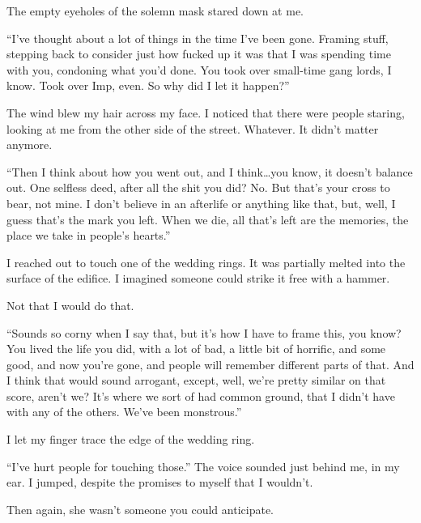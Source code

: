 The empty eyeholes of the solemn mask stared down at me.



``I've thought about a lot of things in the time I've been gone.  Framing stuff, stepping back to consider just how fucked up it was that I was spending time with you, condoning what you'd done.  You took over small-time gang lords, I know.  Took over Imp, even.  So why did I let it happen?''



The wind blew my hair across my face.  I noticed that there were people staring, looking at me from the other side of the street.  Whatever.  It didn't matter anymore.



``Then I think about how you went out, and I think\ldots you know, it doesn't balance out.  One selfless deed, after all the shit you did?  No.  But that's your cross to bear, not mine.  I don't believe in an afterlife or anything like that, but, well, I guess that's the mark you left.  When we die, all that's left are the memories, the place we take in people's hearts.''



I reached out to touch one of the wedding rings.  It was partially melted into the surface of the edifice.  I imagined someone could strike it free with a hammer.



Not that I would do that.



``Sounds so corny when I say that, but it's how I have to frame this, you know?  You lived the life you did, with a lot of bad, a little bit of horrific, and some good, and now you're gone, and people will remember different parts of that.  And I think that would sound arrogant, except, well, we're pretty similar on that score, aren't we?  It's where we sort of had common ground, that I didn't have with any of the others.  We've been monstrous.''



I let my finger trace the edge of the wedding ring.



``I've hurt people for touching those.''  The voice sounded just behind me, in my ear.  I jumped, despite the promises to myself that I wouldn't.



Then again, she wasn't someone you could anticipate.




